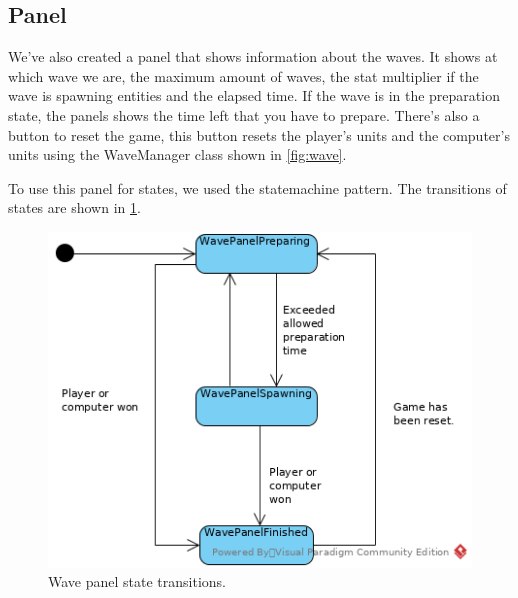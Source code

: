 \subsection{Panel}
\label{sec:wave-panel}

We've also created a panel that shows information about the waves. It shows 
at which wave we are, the maximum amount of waves, the stat multiplier if 
the wave is spawning entities and the elapsed time. If the wave is in the 
preparation state, the panels shows the time left that you have to prepare.
There's also a button to reset the game, this button resets the player's 
units and the computer's units using the WaveManager class shown in 
\cref{fig:wave}.

To use this panel for states, we used the statemachine pattern. The 
transitions of states are shown in \cref{fig:wavepanel-states}.

\begin{figure}[!htb]
    \centering
    \includegraphics{res/wave-panel-states.png}
    \caption{Wave panel state transitions.}\label{fig:wavepanel-states}
\end{figure}
